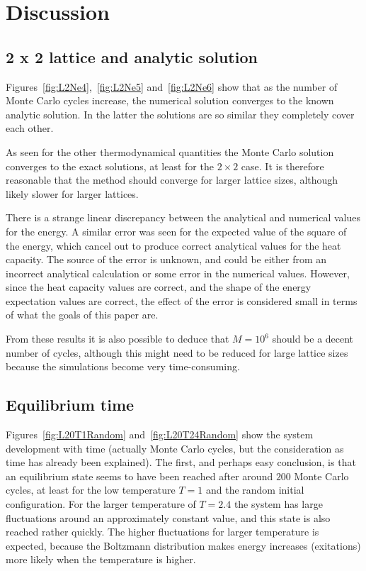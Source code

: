 \documentclass[aps,reprint]{revtex4-1}
\begin{document}
\section{Discussion} \label{sec:discussion}
\subsection{2 x 2 lattice and analytic solution}
Figures~\ref{fig:L2Ne4},~\ref{fig:L2Ne5} and~\ref{fig:L2Ne6} show that as
the number of Monte Carlo cycles increase, the numerical solution converges to
the known analytic solution. In the latter the solutions are so similar they
completely cover each other.

As seen for the other thermodynamical quantities the Monte Carlo solution converges
to the exact solutions, at least for the $2 \times 2$ case. It is therefore reasonable
that the method should converge for larger lattice sizes, although likely slower for
larger lattices.

There is a strange linear discrepancy between the analytical and numerical
values for the energy. A similar error was seen for the expected value of the
square of the energy, which cancel out to produce correct analytical values
for the heat capacity. The source of the error is unknown, and could be either
from an incorrect analytical calculation or some error in the numerical values.
However, since the heat capacity values are correct, and the shape of the energy
expectation values are correct, the effect of the error is considered small
in terms of what the goals of this paper are.

From these results it is also possible to deduce that $M = 10^6$ should be a
decent number of cycles, although this might need to be reduced for large lattice
sizes because the simulations become very time-consuming.
\subsection{Equilibrium time}
Figures~\ref{fig:L20T1Random} and~\ref{fig:L20T24Random} show the system development
with time (actually Monte Carlo cycles, but the consideration as time has already been
explained). The first, and perhaps easy conclusion, is that an equilibrium state
seems to have been reached after around $200$ Monte Carlo cycles, at least for the
low temperature $T = 1$ and the random initial configuration. For the larger temperature of $T = 2.4$ the system has
large fluctuations around an approximately constant value, and this state is also
reached rather quickly. The higher fluctuations for larger temperature is expected,
because the Boltzmann distribution makes energy increases (exitations) more likely when the temperature
is higher.
\end{document}
